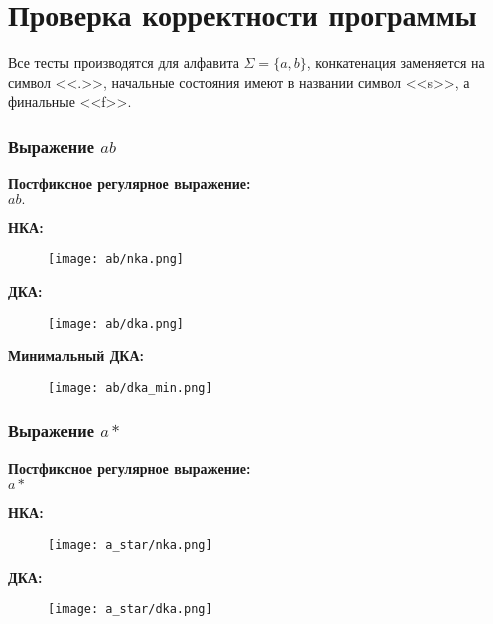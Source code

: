 	\section{Проверка корректности программы}
		Все тесты производятся для алфавита $\Sigma = \{a, b\}$, конкатенация заменяется на символ <<.>>,
		начальные состояния имеют в названии символ <<s>>, а финальные <<f>>.
		\subsubsection{Выражение $ab$}
			\textbf{Постфиксное регулярное выражение:}\\
				$ab.$

			\newpage
			\textbf{НКА:}
				\begin{figure}[h!]
					\begin{center}
						\texttt{[image: ab/nka.png]}
					\end{center}
				\end{figure}

			\textbf{ДКА:}
				\begin{figure}[h!]
					\begin{center}
						\texttt{[image: ab/dka.png]}
					\end{center}
				\end{figure}
			
			\newpage
			\textbf{Минимальный ДКА:}
				\begin{figure}[h!]
					\begin{center}
						\texttt{[image: ab/dka\_min.png]}
					\end{center}
				\end{figure}

		
		\subsubsection{Выражение $a*$}
		\textbf{Постфиксное регулярное выражение:}\\
			$a*$

		\textbf{НКА:}
			\begin{figure}[h!]
				\begin{center}
					\texttt{[image: a\_star/nka.png]}
				\end{center}
			\end{figure}

		\newpage
		\textbf{ДКА:}
			\begin{figure}[h!]
				\begin{center}
					\texttt{[image: a\_star/dka.png]}
				\end{center}
			\end{figure}

